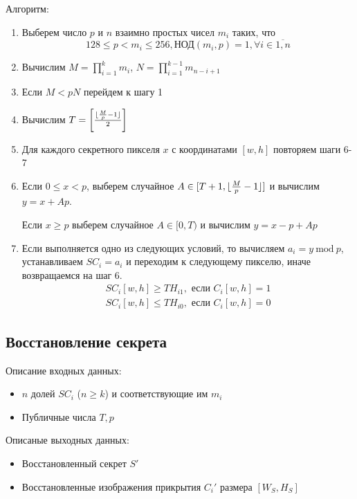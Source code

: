 \documentclass[a4paper,article,14pt]{extarticle}
\newcommand{\Mod}[1]{\ \mathrm{mod}\ #1}
\begin{document}
Алгоритм:
\begin{enumerate}
    \item Выберем число $p$ и $n$ взаимно простых чисел $m_i$ таких, что 
    $$128 \leq p < m_i \leq 256, \text{НОД}(m_i, p)=1, \forall i \in \overline{1,n}$$ 
    \item Вычислим $M=\prod\limits_{i = 1}^k m_i$, $N=\prod\limits_{i = 1}^{k-1} m_{n-i+1}$
    \item Если $M<pN$ перейдем к шагу 1
    \item Вычислим $T=\left[ {{\lfloor{{M}\over{p}}-1\rfloor}\over{2}} \right]$
    \item Для каждого секретного пикселя $x$ с координатами $[w, h]$ повторяем шаги 6-7
    \item Если $0 \leq x < p$, выберем случайное $ A \in [T+1, {\lfloor{{M} \over {p}} - 1\rfloor}]$ и вычислим
    $y = x + Ap$. 
    
    Если $x \geq p$ выберем случайное $ A \in [0, T)$ и вычислим $y = x - p + Ap$
    \item Если выполняется одно из следующих условий, то вычисляем $a_i = y \Mod p$, устанавливаем $SC_i=a_i$ и
    переходим к следующему пикселю, иначе возвращаемся на шаг 6.
    \begin{gather}
        SC_i[w,h] \geq TH_{i1}, \text{ если } C_i[w,h] = 1 \\
        SC_i[w,h] \leq TH_{i0}, \text{ если } C_i[w,h] = 0
    \end{gather}
\end{enumerate}

\subsection{Восстановление секрета}

Описание входных данных:
\begin{itemize}
    \item $n$ долей $SC_i$ ($n \geq k$) и соответствующие им $m_i$
    \item Публичные числа $T, p$
\end{itemize}

Описаные выходных данных:
\begin{itemize}
    \item Восстановленный секрет $S'$
    \item Восстановленные изображения прикрытия $C_{i}'$ размера $[W_S, H_S]$
\end{itemize}
\end{document}
